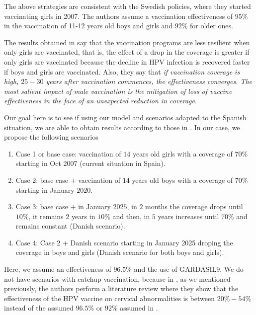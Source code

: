 The above strategies are consistent with the Swedish policies, where they started vaccinating girls in 2007. The authors assume a vaccination effectiveness of $95\%$ in the vaccination of 11-12 years old boys and girls and $92\%$ for older ones.

The results obtained in \cite{Elfstrm2015} say that the vaccination programs are less resilient when only girls are vaccinated, that is, the effect of a drop in the coverage is greater if only girls are vaccinated because the decline in HPV infection is recovered faster if boys and girls are vaccinated. Also, they say that \textit{if vaccination coverage is high, $25-30$ years after vaccination commences, the effectiveness converges. The most salient impact of male vaccination is the mitigation of loss of vaccine effectiveness in the face of an unexpected reduction in coverage}.

Our goal here is to see if using our model and scenarios adapted to the Spanish situation, we are able to obtain results according to those in \cite{Elfstrm2015}. In our case, we propose the following scenarios

\begin{enumerate}
	\item Case 1 or base case: vaccination of $14$ years old girls with a coverage of $70\%$ starting in Oct $2007$ (current situation in Spain).
	\item Case 2: base case $+$ vaccination of $14$ years old boys with a coverage of $70\%$ starting in January $2020$.
	\item Case 3: base case $+$ in January $2025$, in $2$ months the coverage drops until $10\%$, it remains $2$ years in $10\%$ and then, in $5$ years increases until $70\%$ and remains constant (Danish scenario).
	\item Case 4: Case 2 $+$ Danish scenario starting in January 2025 droping the coverage in boys and girls (Danish scenario for both boys and girls).
\end{enumerate}

Here, we assume an effectiveness of $96.5\%$ and the use of GARDASIL9. We do not have scenarios with catchup vaccination, because in \cite{Skufca}, as we mentioned previously, the authors perform a literature review where they show that the effectiveness of the HPV vaccine on cervical abnormalities is between $20\% - 54\%$ instead of the assumed $96.5\%$ or $92\%$ assumed in \cite{Elfstrm2015}. 


